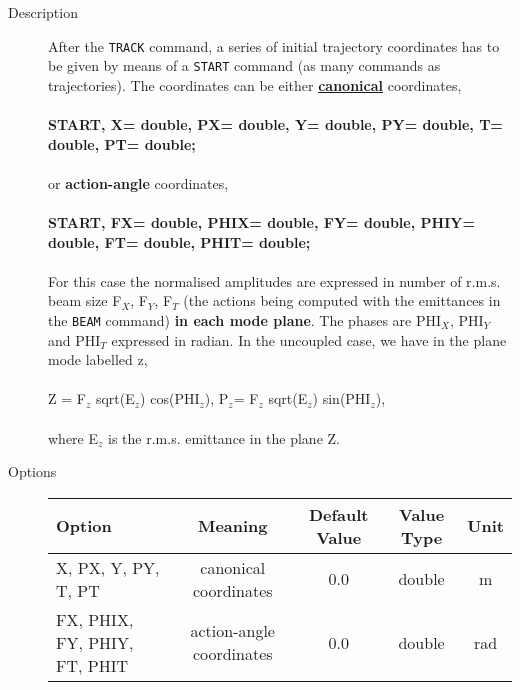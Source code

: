 \begin{description}
	\item[Description] 
          After the \texttt{TRACK} command, a series of initial trajectory coordinates has to be given 
          by means of a \texttt{START} command (as many commands as trajectories). The coordinates can 
          be either \href{../Introduction/tables.html#canon}{\textbf{canonical}} coordinates, 
          \\
          \\\textbf{START, X= double, PX= double, Y= double, PY= double, T= double, PT= double; }
          \\
          \\
          or \textbf{action-angle} coordinates,
          \\
          \\\textbf{START, FX= double, PHIX= double, FY= double, PHIY= double, FT= double, PHIT= double; }
          \\
          \\
          For this case the normalised amplitudes are expressed in number 
          of r.m.s. beam size F$_X$, F$_Y$, F$_T$ (the actions being computed with the 
          emittances in the \texttt{BEAM}
          command) \textbf{in each mode plane}. The phases are PHI$_X$, PHI$_Y$ and PHI$_T$
          expressed in radian. 
          In the uncoupled case, we have in the plane mode labelled z, 
          \\
          \\
          Z = F$_z$ sqrt(E$_z$) cos(PHI$_z$),    
          P$_z$= F$_z$ sqrt(E$_z$) sin(PHI$_z$), 
          \\
          \\ 
          where E$_z$ is the r.m.s. emittance in the plane Z.
          
	\item[Options] 
	  \text{ \\}
	  
          \begin{tabular}{p{3cm} cccc}
            \hline 
            \textbf{Option} & \textbf{Meaning} & \textbf{Default Value} & \textbf{Value Type} & \textbf{Unit} \\ 
            \hline
            X, PX, Y, PY, T, PT & canonical coordinates & 0.0 & double & m \\ 
            \hline
            FX, PHIX, FY, PHIY, FT, PHIT & action-angle coordinates & 0.0 & double & rad \\ 
            \hline
          \end{tabular}
          

\end{description}
